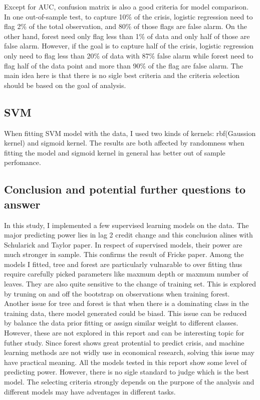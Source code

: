 \documentclass{article}
\begin{document}
Except for AUC, confusion matrix is also a good criteria for model
comparison. In one out-of-sample test, to capture 10\% of the crisis,
logistic regression need to flag 2\% of the total observation, and 80\%
of those flags are false alarm. On the other hand, forest need only flag
less than 1\% of data and only half of those are false alarm. However,
if the goal is to capture half of the crisis, logistic regression only
need to flag less than 20\% of data with 87\% false alarm while forest
need to flag half of the data point and more than 90\% of the flag are
false alarm. The main idea here is that there is no sigle best criteria
and the criteria selection should be based on the goal of analysis.

\subsection*{SVM}

When fitting SVM model with the data, I used two kinds of kernels:
rbf(Gaussion kernel) and sigmoid kernel. The results are both affected
by randomness when fitting the model and sigmoid kernel in general has
better out of sample perfomance. 

\subsection*{Conclusion and potential further questions to answer}

In this study, I implemented
a few supervised learning models on the data. The major predicting
power lies in lag 2 credit change and this conclusion alines with
Schularick and Taylor paper. In respect of supervised models, their
power are much stronger in sample. This confirms the result of Fricke
paper. Among the models I fitted, tree and forest are particularly
vulnarable to over fitting thus require carefully picked parameters like
maxmum depth or maxmum number of leaves. They are also quite sensitive
to the change of training set. This is explored by truning on and off
the bootstrap on observations when training forest. Another issue for
tree and forest is that when there is a dominating class in the training
data, there model generated could be biasd. This issue can be reduced by
balance the data prior fitting or assign similar weight to different
classes. However, these are not explored in this report and can be
interesting topic for futher study. Since forest shows great protential
to predict crisis, and machine learning methods are not widly use in
economical research, solving this issue may have practical meaning. All
the models tested in this report show some level of predicting power.
However, there is no sigle standard to judge which is the best model.
The selecting criteria strongly depends on the purpose of the analysis
and different models may have adventages in different tasks.
\end{document}
